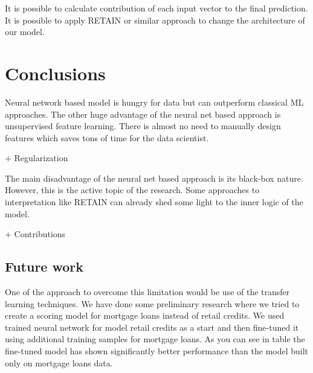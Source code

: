 \documentclass{sigkddExp}
\begin{document}
It is possible to calculate contribution of each input vector to the final prediction. It is possible to apply RETAIN or similar approach to change the architecture of our model.

\section{Conclusions}

Neural network based model is hungry for data but can outperform classical ML approaches. The other huge advantage of the neural net based approach is unsupervised feature learning. There is almost no need to manually design features which saves tons of time for the data scientist.

+ Regularization 

The main disadvantage of the neural net based approach is its black-box nature. However, this is the active topic of the research. Some approaches to interpretation like RETAIN can already shed some light to the inner logic of the model.

+ Contributions

\subsection{Future work}

One of the approach to overcome this limitation would be use of the transfer learning techniques. We have done some preliminary research where we tried to create a scoring model for mortgage loans instead of retail credits. We used trained neural network for model retail credits as a start and then fine-tuned it using additional training samples for mortgage loans. As you can see in table the fine-tuned model has shown significantly better performance than the model built only on mortgage loans data.



\end{document}
